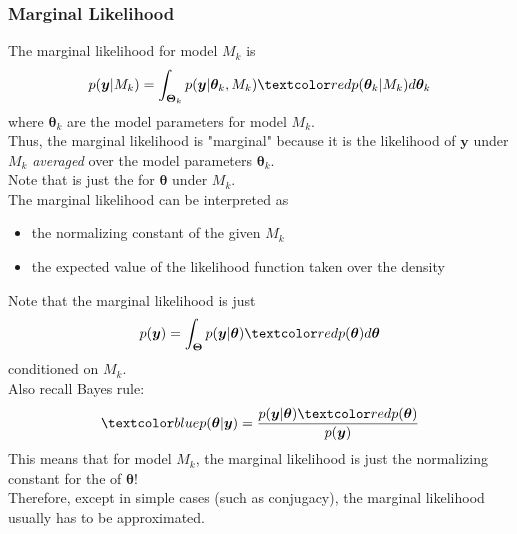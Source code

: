 \documentclass{beamer}
\begin{document}
\begin{frame}
\frametitle{Marginal Likelihood}
\pause
The marginal likelihood for model $M_k$ is
\begin{eqnarray*}
p(\bm{y} | M_k) = \int_{\bm{\Theta}_k} p(\bm{y} | \bm{\theta}_k, M_k) \red{p(\bm{\theta}_k | M_k)} d\bm{\theta}_k
\end{eqnarray*}
\pause
where $\bm{\theta}_k$ are the model parameters for model $M_k$. \\
\pause
\bigskip
Thus, the marginal likelihood is "marginal" because it is the likelihood of $\bm{y}$ under $M_k$ \textit{averaged} over the model parameters $\bm{\theta}_k$.\\
\pause
\bigskip
Note that  is just the  for $\bm{\theta}$ under $M_k$. \\
\pause
\bigskip
The marginal likelihood can be interpreted as 
\pause
\begin{itemize}
\item the normalizing constant of the  given $M_k$
\pause
\item the expected value of the likelihood function taken over the  density
\end{itemize}
\end{frame}

\begin{frame}
Note that the marginal likelihood is just 
\begin{eqnarray*}
p(\bm{y}) = \int_{\bm{\Theta}} p(\bm{y} | \bm{\theta}) \red{p(\bm{\theta})} d\bm{\theta}
\end{eqnarray*}
conditioned on $M_k$. \\
\pause
\bigskip
Also recall Bayes rule:
\begin{eqnarray*}
\blue{p(\bm{\theta} | \bm{y})} = \frac{p(\bm{y} | \bm{\theta}) \red{p(\bm{\theta})}}{p(\bm{y})}
\end{eqnarray*}
\pause
This means that for model $M_k$, the marginal likelihood is just the normalizing constant for the  of $\bm{\theta}$! \\
\pause
\bigskip
Therefore, except in simple cases (such as conjugacy), the marginal likelihood usually has to be approximated.
\end{frame}
\end{document}
